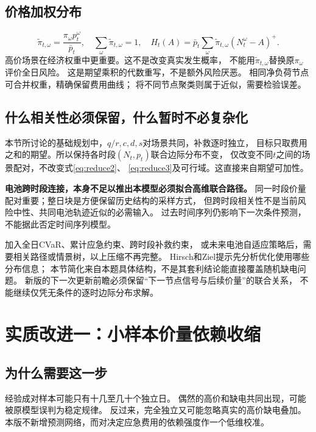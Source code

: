 \documentclass[UTF8,11pt]{ctexart}
\begin{document}
\subsection{价格加权分布}
\begin{equation}\label{eq:weights}
 \widetilde\pi_{t,\omega}
    =\frac{\pi_\omega p_t^\omega}{\bar p_t},\quad
 \sum_\omega\widetilde\pi_{t,\omega}=1,\quad
 H_t(A)=\bar p_t\sum_\omega\widetilde\pi_{t,\omega}(N_t^\omega-A)^+.
\end{equation}
高价场景在经济权重中更重要。这不是改变真实发生概率，
不能用$\widetilde\pi_{t,\omega}$替换原$\pi_\omega$评价全日风险。
这是期望乘积的代数重写，不是额外风险厌恶。
相同净负荷节点可合并权重，精确保留费用曲线；
将不同节点聚类则属于近似，需要检验误差。

\subsection{什么相关性必须保留，什么暂时不必复杂化}
本节所讨论的基础规划中，$q/r,c,d,s$对场景共同，补救逐时独立，
目标只取费用之和的期望。所以保持各时段$(N_t,p_t)$联合边际分布不变，
仅改变不同$t$之间的场景配对，不改变式\eqref{eq:reduce2}、
\eqref{eq:reduce3}及可行域。这直接来自期望可加性。

\textbf{电池跨时段连接，本身不足以推出本模型必须拟合高维联合路径。}
同一时段价量配对重要；整日块是方便保留历史结构的采样方式，
但跨时段相关性不是当前风险中性、共同电池轨迹近似的必需输入。
过去时间序列仍影响下一次条件预测，不能据此否定时间序列模型。

加入全日CVaR、累计应急约束、跨时段补救约束，
或未来电池自适应策略后，需要相关路径或情景树，以上压缩不再完整。
Hirsch和Ziel\cite{hirsch2026}提示先分析优化使用哪些分布信息；
本节简化来自本题具体结构，不是其套利结论能直接覆盖随机缺电问题。
新版的下一次更新前瞻必须保留“下一节点信号与后续价量”的联合关系，
不能继续仅凭无条件的逐时边际分布求解。

\section{实质改进一：小样本价量依赖收缩}\label{sec:shrink}
\subsection{为什么需要这一步}
经验成对样本可能只有十几至几十个独立日。
偶然的高价和缺电共同出现，可能被原模型误判为稳定规律。
反过来，完全独立又可能忽略真实的高价缺电叠加。
本版不新增预测网络，而对决定应急费用的依赖强度作一个低维校准。
\end{document}
